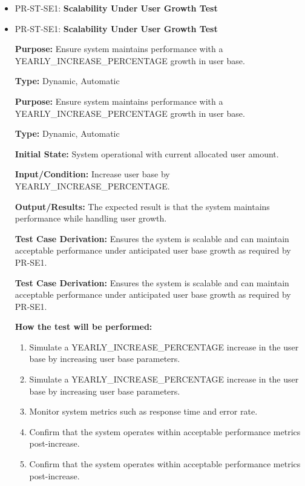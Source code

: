 \documentclass[12pt, titlepage]{article}
\begin{document}
\begin{itemize}
  \item PR-ST-SE1: \textbf{Scalability Under User Growth Test}
  \item PR-ST-SE1: \textbf{Scalability Under User Growth Test}
  \begin{mdframed}[linewidth=0.5mm]
      \textbf{Purpose:} Ensure system maintains performance with a \\ YEARLY\_INCREASE\_PERCENTAGE growth in user base. \par
      \textbf{Type:} Dynamic, Automatic \par
      \textbf{Purpose:} Ensure system maintains performance with a \\ YEARLY\_INCREASE\_PERCENTAGE growth in user base. \par
      \textbf{Type:} Dynamic, Automatic \par
      \textbf{Initial State:} System operational with current allocated user amount. \par
      \textbf{Input/Condition:} Increase user base by YEARLY\_INCREASE\_PERCENTAGE. \par
      \textbf{Output/Results:} The expected result is that the system maintains performance while handling user growth. \par
      \textbf{Test Case Derivation:} Ensures the system is scalable and can maintain acceptable performance under anticipated user base growth as required by PR-SE1. \par
      \textbf{Test Case Derivation:} Ensures the system is scalable and can maintain acceptable performance under anticipated user base growth as required by PR-SE1. \par
      \textbf{How the test will be performed:}
      \begin{enumerate}[noitemsep]
        \item Simulate a YEARLY\_INCREASE\_PERCENTAGE increase in the user base by increasing user base parameters.
        \item Simulate a YEARLY\_INCREASE\_PERCENTAGE increase in the user base by increasing user base parameters.
        \item Monitor system metrics such as response time and error rate.
        \item Confirm that the system operates within acceptable performance metrics post-increase.
        \item Confirm that the system operates within acceptable performance metrics post-increase.
      \end{enumerate}
  \end{mdframed}
\end{itemize}
\end{document}
